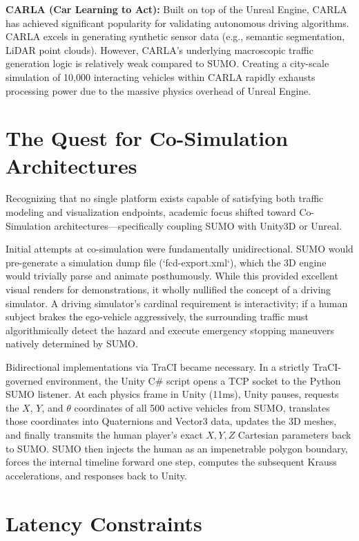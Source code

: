 \textbf{CARLA (Car Learning to Act):} Built on top of the Unreal Engine, CARLA has achieved significant popularity for validating autonomous driving algorithms. CARLA excels in generating synthetic sensor data (e.g., semantic segmentation, LiDAR point clouds). However, CARLA’s underlying macroscopic traffic generation logic is relatively weak compared to SUMO. Creating a city-scale simulation of 10,000 interacting vehicles within CARLA rapidly exhausts processing power due to the massive physics overhead of Unreal Engine.

\section{The Quest for Co-Simulation Architectures}

Recognizing that no single platform exists capable of satisfying both traffic modeling and visualization endpoints, academic focus shifted toward Co-Simulation architectures—specifically coupling SUMO with Unity3D or Unreal. 

Initial attempts at co-simulation were fundamentally unidirectional. SUMO would pre-generate a simulation dump file (`fcd-export.xml`), which the 3D engine would trivially parse and animate posthumously. While this provided excellent visual renders for demonstrations, it wholly nullified the concept of a driving simulator. A driving simulator’s cardinal requirement is interactivity; if a human subject brakes the ego-vehicle aggressively, the surrounding traffic must algorithmically detect the hazard and execute emergency stopping maneuvers natively determined by SUMO.

Bidirectional implementations via TraCI became necessary. In a strictly TraCI-governed environment, the Unity C\# script opens a TCP socket to the Python SUMO listener. At each physics frame in Unity (11ms), Unity pauses, requests the $X$, $Y$, and $\theta$ coordinates of all 500 active vehicles from SUMO, translates those coordinates into Quaternions and Vector3 data, updates the 3D meshes, and finally transmits the human player’s exact $X, Y, Z$ Cartesian parameters back to SUMO. SUMO then injects the human as an impenetrable polygon boundary, forces the internal timeline forward one step, computes the subsequent Krauss accelerations, and responses back to Unity.

\section{Latency Constraints}

